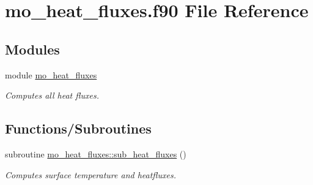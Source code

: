 \hypertarget{mo__heat__fluxes_8f90}{
\section{mo\_\-heat\_\-fluxes.f90 File Reference}
\label{mo__heat__fluxes_8f90}
}
\subsection*{Modules}
\begin{DoxyCompactItemize}
\item 
module \hyperlink{namespacemo__heat__fluxes}{mo\_\-heat\_\-fluxes}


\begin{DoxyCompactList}\small\item\em Computes all heat fluxes. \item\end{DoxyCompactList}

\end{DoxyCompactItemize}
\subsection*{Functions/Subroutines}
\begin{DoxyCompactItemize}
\item 
subroutine \hyperlink{namespacemo__heat__fluxes_a2000a9e639d94c90afda339806cf6839}{mo\_\-heat\_\-fluxes::sub\_\-heat\_\-fluxes} ()
\begin{DoxyCompactList}\small\item\em Computes surface temperature and heatfluxes. \item\end{DoxyCompactList}\end{DoxyCompactItemize}
